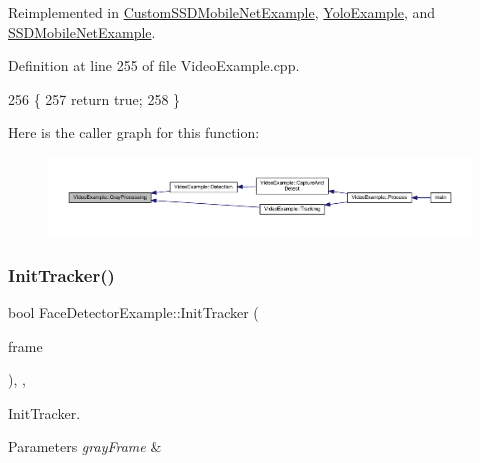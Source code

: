 Reimplemented in \mbox{\hyperlink{class_custom_s_s_d_mobile_net_example_a4c3fe9ac68b5ef4f51d91a6322c5da02}{Custom\+S\+S\+D\+Mobile\+Net\+Example}}, \mbox{\hyperlink{class_yolo_example_aec0d91a32770f9a351d635c30ae54826}{Yolo\+Example}}, and \mbox{\hyperlink{class_s_s_d_mobile_net_example_a34d73a2badba0f9064506dbf276d5cbe}{S\+S\+D\+Mobile\+Net\+Example}}.



Definition at line 255 of file Video\+Example.\+cpp.


\begin{DoxyCode}
256 \{
257     \textcolor{keywordflow}{return} \textcolor{keyword}{true};
258 \}
\end{DoxyCode}
Here is the caller graph for this function\+:\nopagebreak
\begin{figure}[H]
\begin{center}
\leavevmode
\includegraphics[width=350pt]{class_video_example_af8ea44f17711129d2b954d1f01fee1f0_icgraph}
\end{center}
\end{figure}
\mbox{\label{class_face_detector_example_a605d06dff8405d78a99ef3c383e88ad5}} 
\subsubsection{\texorpdfstring{Init\+Tracker()}{InitTracker()}}
{\footnotesize\ttfamily bool Face\+Detector\+Example\+::\+Init\+Tracker (\begin{DoxyParamCaption}\item[{cv\+::\+U\+Mat}]{frame }\end{DoxyParamCaption})\hspace{0.3cm}{\ttfamily [inline]}, {\ttfamily [protected]}, {\ttfamily [virtual]}}



Init\+Tracker. 


\begin{DoxyParams}{Parameters}
{\em gray\+Frame} & \\
\hline
\end{DoxyParams}


